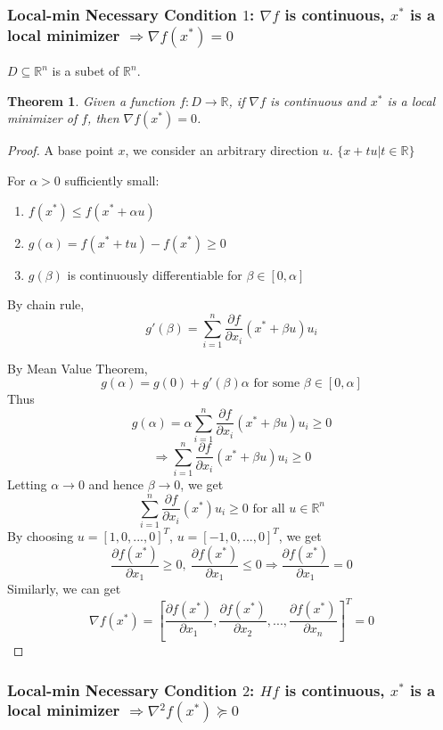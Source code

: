 \documentclass[11pt,a4paper]{article}
\newtheorem{theorem}{Theorem}
\begin{document}
\subsubsection{Local-min Necessary Condition $1$: $\nabla f$ is continuous, $x^*$ is a local minimizer $\Rightarrow \nabla f(x^*)=0$}
$D\subseteq \mathbb{R}^n$ is a subet of $\mathbb{R}^n$.
\begin{theorem}
    Given a function $f:D \rightarrow \mathbb{R}$, if $\nabla f$ is continuous and $x^*$ is a local minimizer of
    $f$, then $\nabla f(x^*)=0$.
\end{theorem}
\begin{proof}
    A base point $x$, we consider an arbitrary direction $u$. $\{x+tu| t\in \mathbb{R}\}$

    For $\alpha>0$ sufficiently small:
    \begin{enumerate}
        \item $f(x^*)\leq f(x^*+\alpha u)$
        \item $g(\alpha)=f(x^*+tu)-f(x^*)\geq 0$
        \item $g(\beta)$ is continuously differentiable for $\beta\in[0,\alpha]$
    \end{enumerate}
    
    By chain rule, $$g'(\beta)=\sum_{i=1}^n \frac{\partial f}{\partial x_i}(x^*+\beta u)u_i$$
    
    By Mean Value Theorem, $$g(\alpha)=g(0)+g'(\beta)\alpha\text{ for some }\beta\in[0,\alpha]$$
    Thus $$g(\alpha)=\alpha\sum_{i=1}^n \frac{\partial f}{\partial x_i}(x^*+\beta u)u_i\geq 0$$
    $$\Rightarrow \sum_{i=1}^n \frac{\partial f}{\partial x_i}(x^*+\beta u)u_i\geq 0$$
    Letting $\alpha \rightarrow	0$ and hence $\beta \rightarrow	0$, we get $$\sum_{i=1}^n \frac{\partial f}{\partial x_i}(x^*)u_i\geq 0\text{ for all }u\in \mathbb{R}^n$$
    By choosing $u=[1,0,...,0]^T$, $u=[-1,0,...,0]^T$, we get $$\frac{\partial f(x^*)}{\partial x_1}\geq 0,\ \frac{\partial f(x^*)}{\partial x_1}\leq 0 \Rightarrow	\frac{\partial f(x^*)}{\partial x_1}= 0$$
    Similarly, we can get $$\nabla f(x^*)=[\frac{\partial f(x^*)}{\partial x_1},\frac{\partial f(x^*)}{\partial x_2},...,\frac{\partial f(x^*)}{\partial x_n}]^T=0$$
\end{proof}

\subsubsection{Local-min Necessary Condition $2$: $Hf$ is continuous, $x^*$ is a local minimizer $\Rightarrow\nabla^2 f(x^*)\succeq 0$}
\end{document}
